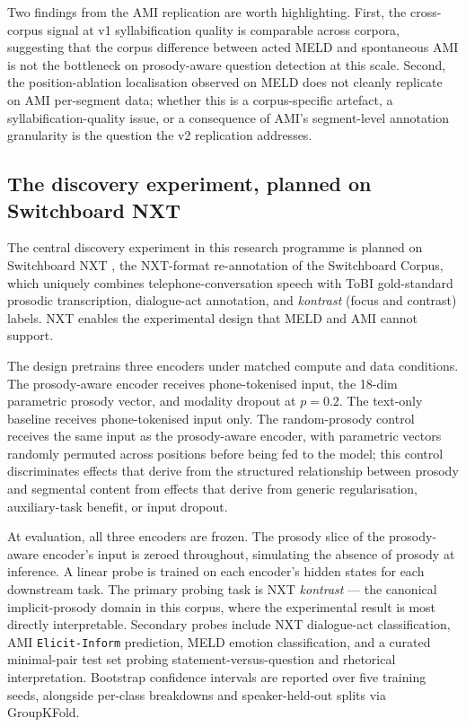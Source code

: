 \documentclass[11pt,letterpaper]{article}
\begin{document}
Two findings from the AMI replication are worth highlighting. First, the cross-corpus signal at v1 syllabification quality is comparable across corpora, suggesting that the corpus difference between acted MELD and spontaneous AMI is not the bottleneck on prosody-aware question detection at this scale. Second, the position-ablation localisation observed on MELD does not cleanly replicate on AMI per-segment data; whether this is a corpus-specific artefact, a syllabification-quality issue, or a consequence of AMI's segment-level annotation granularity is the question the v2 replication addresses.

\subsection{The discovery experiment, planned on Switchboard NXT}\label{sec:nxt-experiment}

The central discovery experiment in this research programme is planned on Switchboard NXT \citep{calhoun2010nxt}, the NXT-format re-annotation of the Switchboard Corpus, which uniquely combines telephone-conversation speech with ToBI gold-standard prosodic transcription, dialogue-act annotation, and \emph{kontrast} (focus and contrast) labels. NXT enables the experimental design that MELD and AMI cannot support.

The design pretrains three encoders under matched compute and data conditions. The prosody-aware encoder receives phone-tokenised input, the 18-dim parametric prosody vector, and modality dropout at $p = 0.2$. The text-only baseline receives phone-tokenised input only. The random-prosody control receives the same input as the prosody-aware encoder, with parametric vectors randomly permuted across positions before being fed to the model; this control discriminates effects that derive from the structured relationship between prosody and segmental content from effects that derive from generic regularisation, auxiliary-task benefit, or input dropout.

At evaluation, all three encoders are frozen. The prosody slice of the prosody-aware encoder's input is zeroed throughout, simulating the absence of prosody at inference. A linear probe is trained on each encoder's hidden states for each downstream task. The primary probing task is NXT \emph{kontrast} --- the canonical implicit-prosody domain in this corpus, where the experimental result is most directly interpretable. Secondary probes include NXT dialogue-act classification, AMI \texttt{Elicit-Inform} prediction, MELD emotion classification, and a curated minimal-pair test set probing statement-versus-question and rhetorical interpretation. Bootstrap confidence intervals are reported over five training seeds, alongside per-class breakdowns and speaker-held-out splits via GroupKFold.
\end{document}
